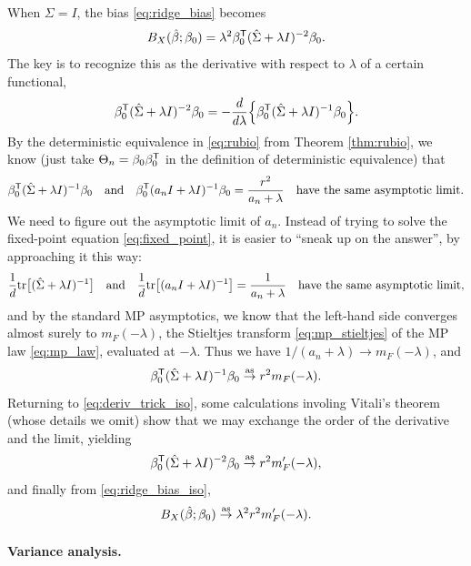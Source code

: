 \documentclass{article}
\begin{document}
When $\Sigma = I$, the bias \eqref{eq:ridge_bias} becomes 
\begin{equation}
\label{eq:ridge_bias_iso}
B_X(\hat{\beta}; \beta_0) = \lambda^2 \beta_0^{\mathsf{T}} (\hat\Sigma + \lambda I)^{-2}
\beta_0.  
\end{equation}
The key is to recognize this as the derivative with respect to $\lambda$ of a
certain functional,
\begin{equation}
\label{eq:deriv_trick_iso}
\beta_0^{\mathsf{T}} (\hat\Sigma + \lambda I)^{-2} \beta_0 = - \frac{d}{d\lambda} \Big \{
\beta_0^{\mathsf{T}} (\hat\Sigma + \lambda I)^{-1} \beta_0 \Big\}.
\end{equation}
By the deterministic equivalence in \eqref{eq:rubio} from Theorem
\ref{thm:rubio}, we know (just take $\Theta_n = \beta_0\beta_0^{\mathsf{T}}$ in the 
definition of deterministic equivalence) that   
\[
\beta_0^{\mathsf{T}} (\hat\Sigma + \lambda I)^{-1} \beta_0 \quad \text{and} \quad 
\beta_0^{\mathsf{T}} (a_n I + \lambda I)^{-1} \beta_0 = \frac{r^2}{a_n + \lambda} \quad
\text{have the same asymptotic limit}. 
\]
We need to figure out the asymptotic limit of $a_n$. Instead of trying to
solve the fixed-point equation \eqref{eq:fixed_point}, it is easier to ``sneak
up on the answer'', by approaching it this way:
\[
\frac{1}{d} \mathrm{tr} \big[ (\hat\Sigma + \lambda I)^{-1} \big] \quad \text{and} \quad 
\frac{1}{d} \mathrm{tr} \big[ (a_n I + \lambda I)^{-1} \big] = \frac{1}{a_n + \lambda}
\quad \text{have the same asymptotic limit},  
\]
and by the standard MP asymptotics, we know that the left-hand side converges
almost surely to $m_F(-\lambda)$, the Stieltjes transform
\eqref{eq:mp_stieltjes} of the MP law \eqref{eq:mp_law}, evaluated at
$-\lambda$. Thus we have $1/(a_n + \lambda) \to m_F(-\lambda)$, and 
\[
\beta_0^{\mathsf{T}} (\hat\Sigma + \lambda I)^{-1} \beta_0 \overset{\mathrm{as}}{\to} r^2 m_F(-\lambda).
\]
Returning to \eqref{eq:deriv_trick_iso}, some calculations involing Vitali's
theorem (whose details we omit) show that we may exchange the order of the 
derivative and the limit, yielding 
\[
\beta_0^{\mathsf{T}} (\hat\Sigma + \lambda I)^{-2} \beta_0 \overset{\mathrm{as}}{\to} r^2 m'_F(-\lambda), 
\]
and finally from \eqref{eq:ridge_bias_iso}, 
\begin{equation}
\label{eq:ridge_bias_iso_limit}
B_X(\hat{\beta}; \beta_0) \overset{\mathrm{as}}{\to} \lambda^2 r^2 m'_F(-\lambda).
\end{equation}

\paragraph{Variance analysis.}
\end{document}
